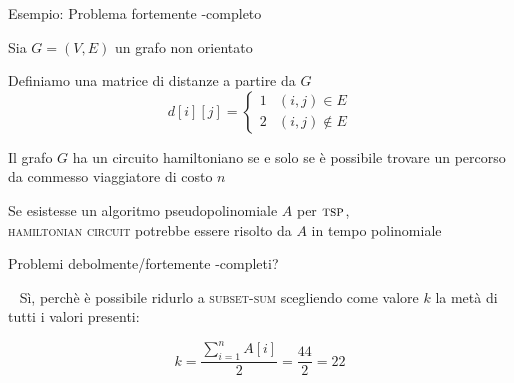 \begin{frame}{Esempio: Problema fortemente \NP-completo}

\vspace{-9pt}
\BIL
\item Sia $G=(V,E)$ un grafo non orientato 
\item Definiamo una matrice di distanze a partire da $G$
\medskip
\[
  d[i][j] = \begin{cases}
    1 & (i,j) \in E \\
    2 & (i,j) \notin E
  \end{cases}
\]    

\item Il grafo $G$ ha un circuito hamiltoniano se e solo se è possibile
trovare un percorso da commesso viaggiatore di costo $n$
\item Se esistesse un algoritmo pseudopolinomiale $A$ per $\textsc{tsp}$, \\
\textsc{hamiltonian circuit} potrebbe essere risolto da $A$ in tempo polinomiale
\EIL
\end{frame}


\begin{frame}{Problemi debolmente/fortemente \NP-completi?}

\vspace{-18pt}

\begin{myboxtitle}
\begin{overprint}
~
Sì, perchè è possibile ridurlo a \textsc{subset-sum} scegliendo come
valore $k$ la metà di tutti i valori presenti:

\[
  k = \frac{\sum_{i=1}^n A[i]}{2} = \frac{44}{2} = 22
\]
\end{overprint}
\end{myboxtitle}

\end{frame}



